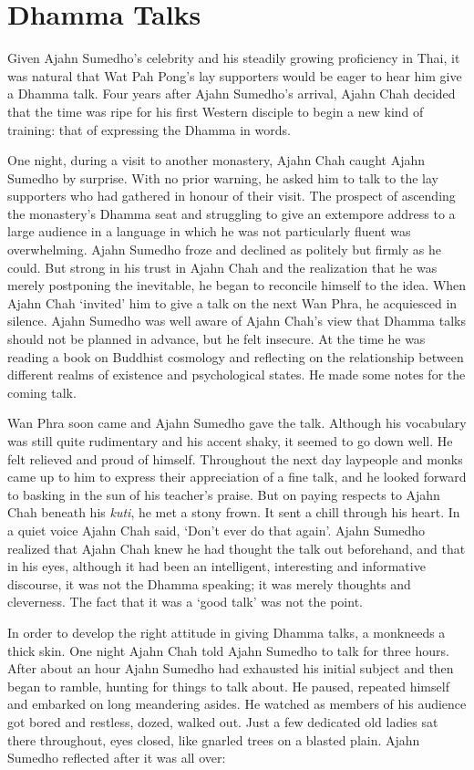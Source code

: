 \section{Dhamma Talks}

Given Ajahn Sumedho's celebrity and his steadily growing proficiency in
Thai, it was natural that Wat Pah Pong's lay supporters would be eager
to hear him give a Dhamma talk. Four years after Ajahn Sumedho's
arrival, Ajahn Chah decided that the time was ripe for his first Western
disciple to begin a new kind of training: that of expressing the Dhamma
in words.

One night, during a visit to another monastery, Ajahn Chah caught Ajahn
Sumedho by surprise. With no prior warning, he asked him to talk to the
lay supporters who had gathered in honour of their visit. The prospect
of ascending the monastery's Dhamma seat and struggling to give an
extempore address to a large audience in a language in which he was not
particularly fluent was overwhelming. Ajahn Sumedho froze and declined
as politely but firmly as he could. But strong in his trust in Ajahn
Chah and the realization that he was merely postponing the inevitable,
he began to reconcile himself to the idea. When Ajahn Chah `invited' him
to give a talk on the next Wan Phra, he acquiesced in silence. Ajahn
Sumedho was well aware of Ajahn Chah's view that Dhamma talks should not
be planned in advance, but he felt insecure. At the time he was reading
a book on Buddhist cosmology and reflecting on the relationship between
different realms of existence and psychological states. He made some
notes for the coming talk.

Wan Phra soon came and Ajahn Sumedho gave the talk. Although his
vocabulary was still quite rudimentary and his accent shaky, it seemed
to go down well. He felt relieved and proud of himself. Throughout the
next day laypeople and monks came up to him to express their
appreciation of a fine talk, and he looked forward to basking in the sun
of his teacher's praise. But on paying respects to Ajahn Chah beneath
his \emph{kuti}, he met a stony frown. It sent a chill through his
heart. In a quiet voice Ajahn Chah said, `Don't ever do that again'.
Ajahn Sumedho realized that Ajahn Chah knew he had thought the talk out
beforehand, and that in his eyes, although it had been an intelligent,
interesting and informative discourse, it was not the Dhamma speaking;
it was merely thoughts and cleverness. The fact that it was a `good
talk' was not the point.

In order to develop the right attitude in giving Dhamma talks, a
monkneeds a thick skin. One night Ajahn Chah told Ajahn Sumedho to talk
for three hours. After about an hour Ajahn Sumedho had exhausted his
initial subject and then began to ramble, hunting for things to talk
about. He paused, repeated himself and embarked on long meandering
asides. He watched as members of his audience got bored and restless,
dozed, walked out. Just a few dedicated old ladies sat there throughout,
eyes closed, like gnarled trees on a blasted plain. Ajahn Sumedho
reflected after it was all over:

